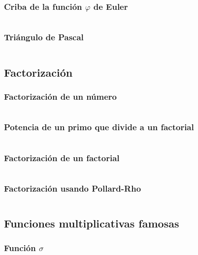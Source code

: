 \documentclass[11pt]{article}
\begin{document}
			\subsubsection{Criba de la función $\varphi$ de Euler}
			\inputminted[tabsize=2,breaklines,firstline=177,lastline=188,fontsize=\small]{c++}{numberTheory.cpp}
			
			\subsubsection{Triángulo de Pascal}
			\inputminted[tabsize=2,breaklines,firstline=190,lastline=201,fontsize=\small]{c++}{numberTheory.cpp}
		
		\subsection{Factorización}
			\subsubsection{Factorización de un número}
			\inputminted[tabsize=2,breaklines,firstline=203,lastline=216,fontsize=\small]{c++}{numberTheory.cpp}
			
			\subsubsection{Potencia de un primo que divide a un factorial}
			\inputminted[tabsize=2,breaklines,firstline=431,lastline=439,fontsize=\small]{c++}{numberTheory.cpp}
			
			\subsubsection{Factorización de un factorial}
			\inputminted[tabsize=2,breaklines,firstline=441,lastline=448,fontsize=\small]{c++}{numberTheory.cpp}
			
			\subsubsection{Factorización usando Pollard-Rho}
			\inputminted[tabsize=2,breaklines,firstline=688,lastline=740,fontsize=\small]{c++}{numberTheory.cpp}
		
		\subsection{Funciones multiplicativas famosas}
			\subsubsection{Función $\sigma$}
			\inputminted[tabsize=2,breaklines,firstline=218,lastline=235,fontsize=\small]{c++}{numberTheory.cpp}
			
\end{document}
